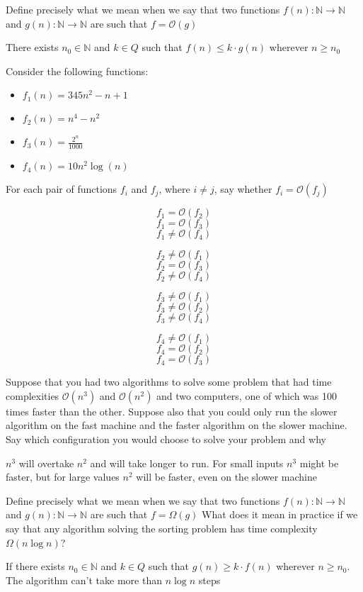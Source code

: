 \documentclass[addpoints]{exam}
\begin{document}
\begin{questions}
\question[2]Define precisely what we mean when we say that two functions $f(n):\mathbb{N}\rightarrow\mathbb{N}$ and $g(n):\mathbb{N}\rightarrow\mathbb{N}$ are such that $f=\mathcal{O}(g)$
\begin{solution}[2in]
	There exists $n_0\in \mathbb{N}$ and $k\in Q$ such that $f(n)\leqslant k\cdot g(n)$ wherever $n\geqslant n_0$
\end{solution}

\question[6]Consider the following functions:
\begin{itemize}
	\item $f_1(n)=345n^2-n+1$
	\item $f_2(n)=n^4-n^2$
	\item $f_3(n)=\frac{2^n}{1000}$
	\item $f_4(n)=10n^2\log(n)$
\end{itemize}
For each pair of functions $f_i$ and $f_j$, where $i\neq j$, say whether $f_i=\mathcal{O}(f_j)$
\begin{solution}[2in]
	$$f_1=\mathcal{O}(f_2)$$
	$$f_1=\mathcal{O}(f_3)$$
	$$f_1\neq \mathcal{O}(f_4)$$
	
	$$f_2\neq \mathcal{O}(f_1)$$
	$$f_2=\mathcal{O}(f_3)$$
	$$f_2\neq\mathcal{O}(f_4)$$
	
	$$f_3\neq\mathcal{O}(f_1)$$
	$$f_3\neq\mathcal{O}(f_2)$$
	$$f_3\neq\mathcal{O}(f_4)$$
	
	$$f_4\neq\mathcal{O}(f_1)$$
	$$f_4=\mathcal{O}(f_2)$$
	$$f_4=\mathcal{O}(f_3)$$
	
\end{solution}


\question[4]Suppose that you had two algorithms to solve some problem that had
time complexities $\mathcal{O}(n^3)$ and $\mathcal{O}(n^2)$ and two computers, one of which
was 100 times faster than the other. Suppose also that you could only
run the slower algorithm on the fast machine and the faster algorithm
on the slower machine. Say which configuration you would choose to
solve your problem and why
\begin{solution}[2in]
	$n^3$ will overtake $n^2$ and will take longer to run. For small inputs $n^3$ might be faster, but for large values $n^2$ will be faster, even on the slower machine
\end{solution}

\question[4]
Define precisely what we mean when we say that two functions $f(n):\mathbb{N}\rightarrow\mathbb{N}$ and $g(n):\mathbb{N}\rightarrow\mathbb{N}$ are such that $f=\Omega(g)$ What does it mean in practice if we say that any algorithm solving the sorting problem has time complexity $\Omega(n\log n)$?
\begin{solution}[2in]
	If there exists $n_0\in \mathbb{N}$ and $k\in Q$ such that $g(n)\geqslant k\cdot f(n)$ wherever $n\geqslant n_0$. The algorithm can't take more than $n\log n$ steps
\end{solution}


\end{questions}
\end{document}
